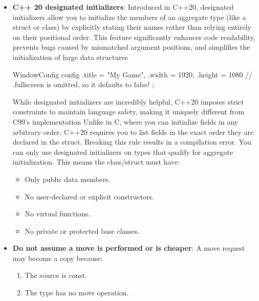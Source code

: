 \documentclass{report}
\begin{document}
\begin{itemize}
\begin{cppcode}
            cout << pi<double> << '\n';
            cout << pi<float> << '\n';
            cout << pi<int> << '\n';
            \end{cppcode}
        \item \textbf{C++ 20 designated initializers}: Introduced in C++20, designated initializers allow you to initialize the members of an aggregate type (like a struct or class) by explicitly stating their names rather than relying entirely on their positional order. This feature significantly enhances code readability, prevents bugs caused by mismatched argument positions, and simplifies the initialization of large data structures
            \bigbreak \noindent 
            \begin{cppcode}
            WindowConfig config {
                .title = "My Game",
                .width = 1920,
                .height = 1080
                // .fullscreen is omitted, so it defaults to false!
            };
            \end{cppcode}
            \bigbreak \noindent 
            While designated initializers are incredibly helpful, C++20 imposes strict constraints to maintain language safety, making it uniquely different from C99's implementation
            \bigbreak \noindent 
            Unlike in C, where you can initialize fields in any arbitrary order, C++20 requires you to list fields in the exact order they are declared in the struct. Breaking this rule results in a compilation error.
            \bigbreak \noindent 
            You can only use designated initializers on types that qualify for aggregate initialization. This means the class/struct must have:
            \begin{itemize}
                \item Only public data members.
                \item No user-declared or explicit constructors.
                \item No virtual functions.
                \item No private or protected base classes.
            \end{itemize}
        \item \textbf{Do not assume a move is performed or is cheaper}: A move request may become a copy because:
            \begin{enumerate}
                \item The source is const.
                \item The type has no move operation.

\end{enumerate}
\end{itemize}
\end{document}
